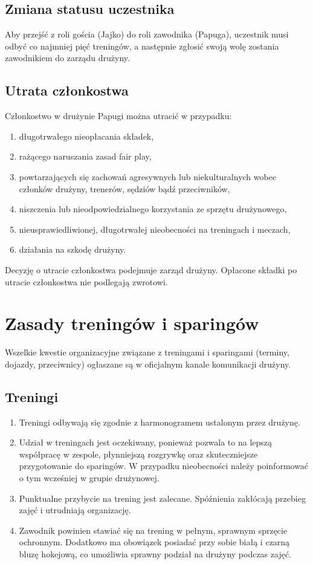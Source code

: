 \documentclass[12pt,a4paper]{article}
\let\stdsection\section
\renewcommand\section{\clearpage\stdsection}
\begin{document}
\subsection{Zmiana statusu uczestnika}
Aby przejść z roli gościa (Jajko) do roli zawodnika (Papuga), uczestnik musi odbyć co najmniej pięć treningów, a następnie zgłosić swoją wolę zostania zawodnikiem do zarządu drużyny.

\subsection{Utrata członkostwa}
Członkostwo w drużynie Papugi można utracić w przypadku:
\begin{enumerate}
    \item długotrwałego nieopłacania składek,
    \item rażącego naruszania zasad fair play,
    \item powtarzających się zachowań agresywnych lub niekulturalnych wobec członków drużyny, trenerów, sędziów bądź przeciwników,
    \item niszczenia lub nieodpowiedzialnego korzystania ze sprzętu drużynowego,
    \item nieusprawiedliwionej, długotrwałej nieobecności na treningach i meczach,
    \item działania na szkodę drużyny.
\end{enumerate}
Decyzję o utracie członkostwa podejmuje zarząd drużyny. Opłacone składki po utracie członkostwa nie podlegają zwrotowi.

\section{Zasady treningów i sparingów}
Wszelkie kwestie organizacyjne związane z treningami i sparingami (terminy, dojazdy, przeciwnicy) ogłaszane są w oficjalnym kanale komunikacji drużyny.

\subsection{Treningi}
\begin{enumerate}
  \item Treningi odbywają się zgodnie z harmonogramem ustalonym przez drużynę.
  \item Udział w treningach jest oczekiwany, ponieważ pozwala to na lepszą współpracę w zespole, płynniejszą rozgrywkę oraz skuteczniejsze przygotowanie do sparingów. W przypadku nieobecności należy poinformować o tym wcześniej w grupie drużynowej.
  \item Punktualne przybycie na trening jest zalecane. Spóźnienia zakłócają przebieg zajęć i utrudniają organizację.
  \item Zawodnik powinien stawiać się na trening w pełnym, sprawnym sprzęcie ochronnym. Dodatkowo ma obowiązek posiadać przy sobie białą i czarną bluzę hokejową, co umożliwia sprawny podział na drużyny podczas zajęć.

\end{enumerate}
\end{document}
